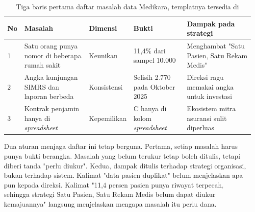 \begin{table}[!htb]
  \centering
  \caption{Tiga baris pertama daftar masalah data Medikara, templatnya tersedia
           di }
  \label{tab:ch06-daftar-masalah}
  \begin{tabularx}{\textwidth}{lXlXX}
    \hline
    \textbf{No} & \textbf{Masalah} & \textbf{Dimensi} & \textbf{Bukti} &
      \textbf{Dampak pada strategi} \\
    \hline
    1 & Satu orang punya nomor di beberapa rumah sakit & Keunikan & 11,4\% dari
      sampel 10.000 & Menghambat "Satu Pasien, Satu Rekam Medis" \\
    \hline
    2 & Angka kunjungan SIMRS dan laporan berbeda & Konsistensi & Selisih 2.770
      pada Oktober 2025 & Direksi ragu memakai angka untuk investasi \\
    \hline
    3 & Kontrak penjamin hanya di \textit{spreadsheet} & Kepemilikan & C hanya
      di kolom \textit{spreadsheet} & Ekosistem mitra asuransi sulit
      diperluas \\
    \hline
  \end{tabularx}
\end{table}

Dua aturan menjaga daftar ini tetap berguna. Pertama, setiap masalah harus
punya bukti berangka. Masalah yang belum terukur tetap boleh ditulis, tetapi
diberi tanda "perlu diukur". Kedua, dampak ditulis terhadap strategi
organisasi, bukan terhadap sistem. Kalimat "data pasien duplikat" belum
menjelaskan apa pun kepada direksi. Kalimat "11,4 persen pasien punya riwayat
terpecah, sehingga strategi Satu Pasien, Satu Rekam Medis belum dapat
diukur kemajuannya" langsung menjelaskan mengapa masalah itu perlu dana.

